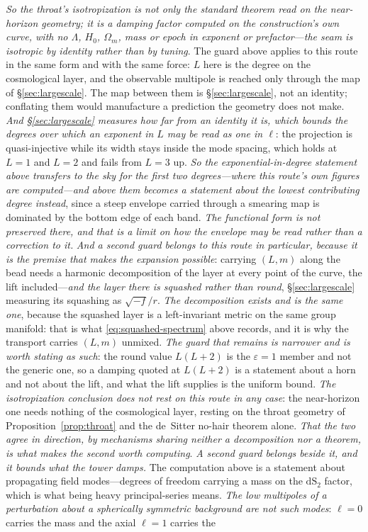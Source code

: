 \documentclass[11pt,a4paper]{article}
\theoremstyle{plain}
\theoremstyle{definition}
\theoremstyle{remark}
\newcommand{\dS}{\mathrm{dS}}
\begin{document}
\emph{So the throat's isotropization is not only the standard theorem read on the near-horizon geometry; it is a damping factor computed on the construction's own curve, with no $\Lambda$, $H_0$, $\Omega_m$, mass or epoch in exponent or prefactor}---\emph{the seam is isotropic by identity rather than by tuning}. The guard above applies to this route in the same form and with the same force: $L$ here is the degree on the cosmological layer, and the observable multipole is reached only through the map of \S\ref{sec:largescale}. The map between them is \S\ref{sec:largescale}, not an identity; conflating them would manufacture a prediction the geometry does not make. \emph{And \S\ref{sec:largescale} measures how far from an identity it is, which bounds the degrees over which an exponent in $L$ may be read as one in $\ell$}: the projection is quasi-injective while its width stays inside the mode spacing, which holds at $L=1$ and $L=2$ and fails from $L=3$ up. \emph{So the exponential-in-degree statement above transfers to the sky for the first two degrees---where this route's own figures are computed---and above them becomes a statement about the lowest contributing degree instead}, since a steep envelope carried through a smearing map is dominated by the bottom edge of each band. \emph{The functional form is not preserved there, and that is a limit on how the envelope may be read rather than a correction to it.} \emph{And a second guard belongs to this route in particular, because it is the premise that makes the expansion possible}: carrying $(L,m)$ along the bead needs a harmonic decomposition of the layer at every point of the curve, the lift included---\emph{and the layer there is squashed rather than round}, \S\ref{sec:largescale} measuring its squashing as $\sqrt{-f}/r$. \emph{The decomposition exists and is the same one}, because the squashed layer is a left-invariant metric on the same group manifold: that is what \eqref{eq:squashed-spectrum} above records, and it is why the transport carries $(L,m)$ unmixed. \emph{The guard that remains is narrower and is worth stating as such}: the round value $L(L+2)$ is the $\varepsilon=1$ member and not the generic one, so a damping quoted at $L(L+2)$ is a statement about a horn and not about the lift, and what the lift supplies is the uniform bound. \emph{The isotropization conclusion does not rest on this route in any case}: the near-horizon one needs nothing of the cosmological layer, resting on the throat geometry of Proposition~\ref{prop:throat} and the de~Sitter no-hair theorem alone. \emph{That the two agree in direction, by mechanisms sharing neither a decomposition nor a theorem, is what makes the second worth computing}. \emph{A second guard belongs beside it, and it bounds what the tower damps.} The computation above is a statement about propagating field modes---degrees of freedom carrying a mass on the $\dS_2$ factor, which is what being heavy principal-series means. \emph{The low multipoles of a perturbation about a spherically symmetric background are not such modes}: $\ell=0$ carries the mass and the axial $\ell=1$ carries the 
\end{document}

